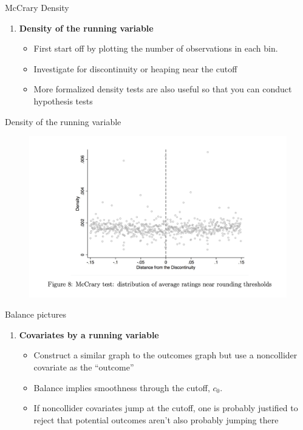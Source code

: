 \documentclass{beamer}
\begin{document}
\begin{frame}{McCrary Density}
	
	\begin{enumerate}\addtocounter{enumi}{2}
	\item \textbf{Density of the running variable}
		\begin{itemize}
		\item First start off by plotting the number of observations in each bin.
		\item Investigate for discontinuity or heaping near the cutoff
		\item More formalized density tests are also useful so that you can conduct hypothesis tests
		\end{itemize}
	\end{enumerate}
\end{frame}


\begin{frame}{Density of the running variable}
	
	\begin{figure}
	\includegraphics[scale=0.45]{./lecture_includes/david_density}
	\end{figure}
	
\end{frame}

\begin{frame}{Balance pictures}

\begin{enumerate}\addtocounter{enumi}{3}
	\item \textbf{Covariates by a running variable}
		\begin{itemize}
		\item Construct a similar graph to the outcomes graph but use a noncollider covariate as the ``outcome''
		\item Balance implies smoothness through the cutoff, $c_0$.  
		\item If noncollider covariates jump at the cutoff, one is probably justified to reject that potential outcomes aren't also probably jumping there
		\end{itemize}
	\end{enumerate}
\end{frame}
\end{document}
